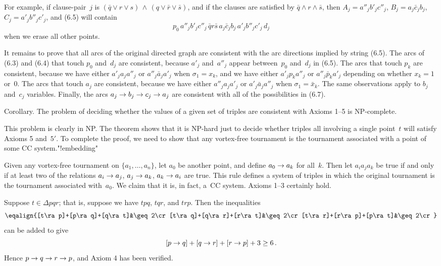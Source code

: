 For example, if clause-pair~$j$ is $(\bar{q}\vee r\vee s)\,\wedge\,
(q\vee\bar{r}\vee\bar{s})$, and if the clauses are satisfied by
$\bar{q}\wedge r\wedge\bar{s}$, then $A_j=a''_jb'_jc''_j$,
$B_j=a_j\bar{c}_jb_j$,  $C_j=a'_jb''_jc'_j$, and (6.5) will contain
$$p_0\,a''_jb'_jc''_j\,\bar{q}r\bar{s}\,a_j\bar{c}_jb_j\,a'_jb''_jc'_j\,d_j$$
when we erase all other points. 

It remains to prove that all arcs of the original directed graph are
consistent with the arc directions implied by string (6.5). The arcs
of (6.3) and (6.4) that touch $p_0$ and~$d_j$ are consistent, because
$a'_j$ and~$a''_j$ appear between~$p_0$ and~$d_j$ in (6.5). The arcs
that touch $p_k$ are consistent, because we have either 
$a'_ja_ja''_j$ or $a''_j\bar{a}_ja'_j$ when $\sigma_1=x_k$, and we
have either $a'_jp_ka''_j$
or $a''_j\bar{p}_ka'_j$ depending on whether $x_k=1$ or~0. The arcs
that touch $a_j$ are consistent, because we have either $a''_ja_ja'_j$
or $a'_j\bar{a}_ja''_j$ when $\sigma_1=\bar{x}_k$. The same
observations apply to $b_j$ and~$c_j$ variables. Finally, the arcs
$a_j\rightarrow b_j\rightarrow c_j\rightarrow a_j$ are consistent with all of the
possibilities in (6.7).\quad\pfbox

\proclaim Corollary. The problem of deciding whether the values of a
given set of triples are consistent with Axioms 1--5 is NP-complete. 

\quad
This problem is clearly in NP. The theorem shows that it is NP-hard
just to decide whether triples all involving a single point~$t$ will
satisfy Axioms 5 and~$5'$. To complete the proof, we need to show that
any vortex-free tournament is the tournament associated with a point
of some CC system."!embedding"

Given any vortex-free tournament on $\{a_1,\ldots,a_n\}$, let $a_0$ be
another point, and define $a_0\rightarrow a_k$ for all~$k$. Then let
$a_ia_ja_k$ be true if and only if at least two of the relations
$a_i\rightarrow a_j$, $a_j\rightarrow a_k$, $a_k\rightarrow a_i$ are true. This rule defines a
system of triples in which the original tournament is the tournament
associated with~$a_0$. We claim that it is, in fact, a~CC system.
Axioms 1--3 certainly hold.

Suppose $t\in\Delta pqr$; that is, suppose we have $tpq$, $tqr$, and
$trp$. Then the inequalities
$$\eqalign{%
[t\ra p]+[p\ra q]+[q\ra t]&\geq 2\cr
[t\ra q]+[q\ra r]+[r\ra t]&\geq 2\cr
[t\ra r]+[r\ra p]+[p\ra t]&\geq 2\cr}$$
can be added to give
$$[p\rightarrow q]+[q\rightarrow r]+[r\rightarrow p]+3\geq 6\,.$$
Hence $p\rightarrow q\rightarrow r\rightarrow p$, and Axiom 4 has been verified.

